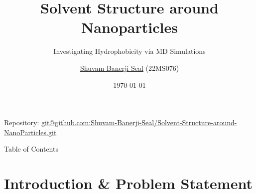 \documentclass[aspectratio=169, 10pt]{beamer}
\title{Solvent Structure around Nanoparticles}
\subtitle{Investigating Hydrophobicity via MD Simulations}
\author{\href{https://shuvam-banerji-seal.github.io/}{Shuvam Banerji Seal} (22MS076)}
\institute{Indian Institute of Science Education and Research Kolkata}
\date{\today}
\begin{document}
\begin{frame}

    \titlepage
    \scriptsize Repository: \url{git@github.com:Shuvam-Banerji-Seal/Solvent-Structure-around-NanoParticles.git}
\end{frame}

\begin{frame}[allowframebreaks]{Table of Contents}
    \tableofcontents
\end{frame}

\section{Introduction \& Problem Statement}
\end{document}
